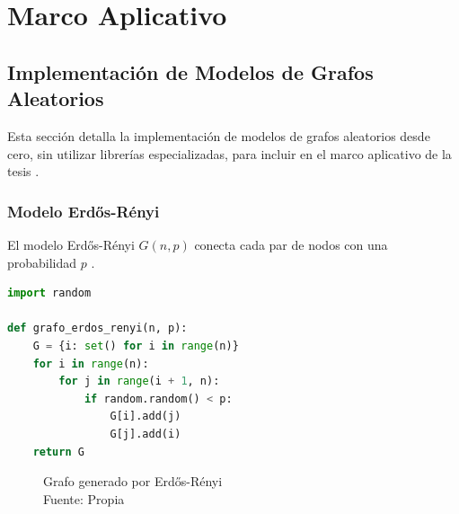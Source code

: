 \chapter{Marco Aplicativo}

\section{Implementación de Modelos de Grafos Aleatorios}
Esta sección detalla la implementación de modelos de grafos aleatorios desde cero, sin utilizar librerías especializadas, para incluir en el marco aplicativo de la tesis .


\subsection{Modelo Erdős-Rényi}
El modelo Erdős-Rényi \( G(n, p) \) conecta cada par de nodos con una probabilidad \( p \) .

\begin{lstlisting}[language=Python]
import random
    
def grafo_erdos_renyi(n, p):
    G = {i: set() for i in range(n)}
    for i in range(n):
        for j in range(i + 1, n):
            if random.random() < p:
                G[i].add(j)
                G[j].add(i)
    return G
\end{lstlisting}
\newpage

\begin{figure}
\caption{Grafo generado por Erdős-Rényi\\Fuente: Propia}
\end{figure}

